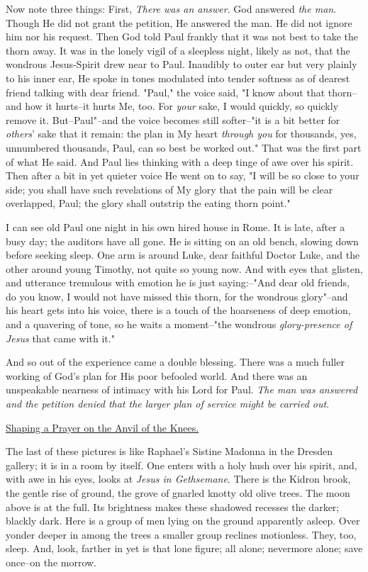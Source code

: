 Now note three things: First, \textit{There was an answer}. God answered \textit{the
man}. Though He did not grant the petition, He answered the man. He did
not ignore him nor his request. Then God told Paul frankly that it was not
best to take the thorn away. It was in the lonely vigil of a sleepless
night, likely as not, that the wondrous Jesus-Spirit drew near to Paul.
Inaudibly to outer ear but very plainly to his inner ear, He spoke in
tones modulated into tender softness as of dearest friend talking with
dear friend. "Paul," the voice said, "I know about that thorn--and how it
hurts--it hurts Me, too. For \textit{your} sake, I would quickly, so quickly
remove it. But--Paul"--and the voice becomes still softer--"it is a bit
better for \textit{others}' sake that it remain: the plan in My heart \textit{through
you} for thousands, yes, unnumbered thousands, Paul, can so best be worked
out." That was the first part of what He said. And Paul lies thinking with
a deep tinge of awe over his spirit. Then after a bit in yet quieter voice
He went on to say, "I will be so close to your side; you shall have such
revelations of My glory that the pain will be clear overlapped, Paul; the
glory shall outstrip the eating thorn point."

I can see old Paul one night in his own hired house in Rome. It is late,
after a busy day; the auditors have all gone. He is sitting on an old
bench, slowing down before seeking sleep. One arm is around Luke, dear
faithful Doctor Luke, and the other around young Timothy, not quite so
young now. And with eyes that glisten, and utterance tremulous with
emotion he is just saying:--"And dear old friends, do you know, I would
not have missed this thorn, for the wondrous glory"--and his heart gets
into his voice, there is a touch of the hoarseness of deep emotion, and a
quavering of tone, so he waits a moment--"the wondrous \textit{glory-presence of
Jesus} that came with it."

And so out of the experience came a double blessing. There was a much
fuller working of God's plan for His poor befooled world. And there was an
unspeakable nearness of intimacy with his Lord for Paul. \textit{The man was
answered and the petition denied that the larger plan of service might be
carried out}.



\underline{Shaping a Prayer on the Anvil of the Knees.}


The last of these pictures is like Raphael's Sistine Madonna in the
Dresden gallery; it is in a room by itself. One enters with a holy hush
over his spirit, and, with awe in his eyes, looks at \textit{Jesus in
Gethsemane}. There is the Kidron brook, the gentle rise of ground, the
grove of gnarled knotty old olive trees. The moon above is at the full.
Its brightness makes these shadowed recesses the darker; blackly dark.
Here is a group of men lying on the ground apparently asleep. Over yonder
deeper in among the trees a smaller group reclines motionless. They, too,
sleep. And, look, farther in yet is that lone figure; all alone; nevermore
alone; save once--on the morrow.

